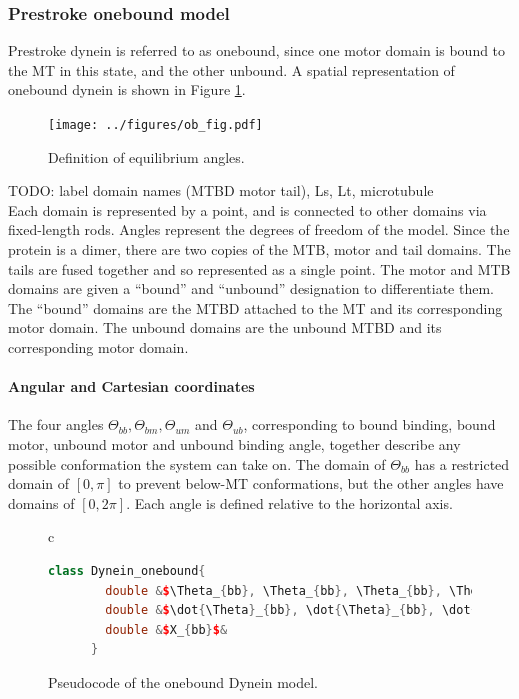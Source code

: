 \documentclass[10pt]{article} %
\begin{document}
\subsubsection{Prestroke onebound model}
Prestroke dynein is referred to as onebound, since one motor domain is bound to the MT in this state, and the other unbound. A spatial representation of onebound dynein is shown in Figure \ref{ob_fig}. 

\begin{figure}[h]
  \centering
  \texttt{[image: ../figures/ob\_fig.pdf]}
  \caption{Definition of equilibrium angles.}
  \label{ob_fig}
\end{figure}

TODO: label domain names (MTBD motor tail), Ls, Lt, microtubule\\

Each domain is represented by a point, and is connected to other domains via fixed-length rods. Angles represent the degrees of freedom of the model. Since the protein is a dimer, there are two copies of the MTB, motor and tail domains. The tails are fused together and so represented as a single point. The motor and MTB domains are given a ``bound'' and ``unbound'' designation to differentiate them. The ``bound'' domains are the MTBD attached to the MT and its corresponding motor domain. The unbound domains are the unbound MTBD and its corresponding motor domain.\\

\paragraph{Angular and Cartesian coordinates}

The four angles $\Theta_{bb}, \Theta_{bm}, \Theta_{um}$ and $\Theta_{ub}$, corresponding to bound binding, bound motor, unbound motor and unbound binding angle, together describe any possible conformation the system can take on. The domain of $\Theta_{bb}$ has a restricted domain of $[0,\pi]$ to prevent below-MT conformations, but the other angles have domains of $[0,2\pi]$. Each angle is defined relative to the horizontal axis.\\

\begin{figure}[h]
  \centering
  \begin{tabular}{c}
    \begin{lstlisting}[language=C++]
      class Dynein_onebound{
        double &$\Theta_{bb}, \Theta_{bb}, \Theta_{bb}, \Theta_{bb}$&
        double &$\dot{\Theta}_{bb}, \dot{\Theta}_{bb}, \dot{\Theta}_{bb}, \dot{\Theta}_{bb}$&
        double &$X_{bb}$&
      }
    \end{lstlisting}
  \end{tabular}
  \caption{Pseudocode of the onebound Dynein model.}
  \label{ob_struct}
\end{figure}
\end{document}
